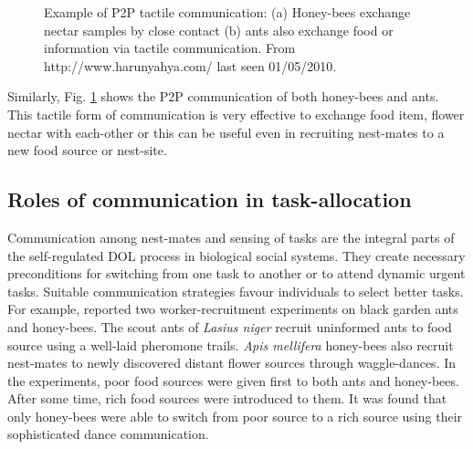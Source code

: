 \begin{figure}[H]
\centering
{} 
\hspace{0.25cm}
\caption{Example of P2P tactile communication: (a) Honey-bees exchange nectar samples by close contact (b) ants also exchange food or information via tactile communication. %
From http://www.harunyahya.com/ last seen 01/05/2010.}
\label{fig:bees-ants-p2p-comm}
\end{figure}

Similarly, Fig. \ref{fig:bees-ants-p2p-comm} shows the P2P communication of both honey-bees and ants. This tactile form of communication is very effective to exchange food item, flower nectar with each-other or this can be useful even in recruiting nest-mates to a new food source or nest-site. 
\subsection{Roles of communication in task-allocation}
\label{bg:bio-comm:comm-role}
Communication among nest-mates and sensing of tasks are the integral parts of the self-regulated DOL process in biological social systems. They create necessary  preconditions for switching from one task to another or to attend dynamic urgent tasks. Suitable communication strategies favour individuals to select better tasks. For example,  reported two worker-recruitment experiments on black garden ants and honey-bees. The scout ants of {\em Lasius niger}  recruit uninformed ants to food source using a well-laid pheromone trails. {\em Apis mellifera} honey-bees also recruit nest-mates to newly discovered distant flower sources through waggle-dances. In the experiments,  poor food sources were given first to both ants and honey-bees. After some time,  rich food sources were introduced  to them. It was found that only honey-bees were able to switch from poor source to a rich source using their sophisticated dance communication.

